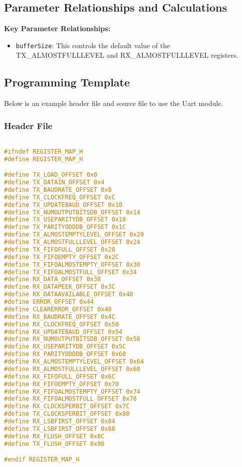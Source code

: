 \subsection{Parameter Relationships and Calculations}

\textbf{Key Parameter Relationships:}
\begin{itemize}
    \item \texttt{bufferSize}: This controls the default value of the TX\_ALMOSTFULLLEVEL and RX\_ALMOSTFULLLEVEL registers.
\end{itemize}

\subsection{Programming Template}

Below is an example header file and source file to use the Uart module.

\subsubsection{Header File}

\begin{lstlisting}[language=C,frame=single,label={lst:header}]

#ifndef REGISTER_MAP_H
#define REGISTER_MAP_H

#define TX_LOAD_OFFSET 0x0
#define TX_DATAIN_OFFSET 0x4
#define TX_BAUDRATE_OFFSET 0x8
#define TX_CLOCKFREQ_OFFSET 0xC
#define TX_UPDATEBAUD_OFFSET 0x10
#define TX_NUMOUTPUTBITSDB_OFFSET 0x14
#define TX_USEPARITYDB_OFFSET 0x18
#define TX_PARITYODDDB_OFFSET 0x1C
#define TX_ALMOSTEMPTYLEVEL_OFFSET 0x20
#define TX_ALMOSTFULLLEVEL_OFFSET 0x24
#define TX_FIFOFULL_OFFSET 0x28
#define TX_FIFOEMPTY_OFFSET 0x2C
#define TX_FIFOALMOSTEMPTY_OFFSET 0x30
#define TX_FIFOALMOSTFULL_OFFSET 0x34
#define RX_DATA_OFFSET 0x38
#define RX_DATAPEEK_OFFSET 0x3C
#define RX_DATAAVAILABLE_OFFSET 0x40
#define ERROR_OFFSET 0x44
#define CLEARERROR_OFFSET 0x48
#define RX_BAUDRATE_OFFSET 0x4C
#define RX_CLOCKFREQ_OFFSET 0x50
#define RX_UPDATEBAUD_OFFSET 0x54
#define RX_NUMOUTPUTBITSDB_OFFSET 0x58
#define RX_USEPARITYDB_OFFSET 0x5C
#define RX_PARITYODDDB_OFFSET 0x60
#define RX_ALMOSTEMPTYLEVEL_OFFSET 0x64
#define RX_ALMOSTFULLLEVEL_OFFSET 0x68
#define RX_FIFOFULL_OFFSET 0x6C
#define RX_FIFOEMPTY_OFFSET 0x70
#define RX_FIFOALMOSTEMPTY_OFFSET 0x74
#define RX_FIFOALMOSTFULL_OFFSET 0x78
#define RX_CLOCKSPERBIT_OFFSET 0x7C
#define TX_CLOCKSPERBIT_OFFSET 0x80
#define RX_LSBFIRST_OFFSET 0x84
#define TX_LSBFIRST_OFFSET 0x88
#define RX_FLUSH_OFFSET 0x8C
#define TX_FLUSH_OFFSET 0x90

#endif REGISTER_MAP_H
\end{lstlisting}


